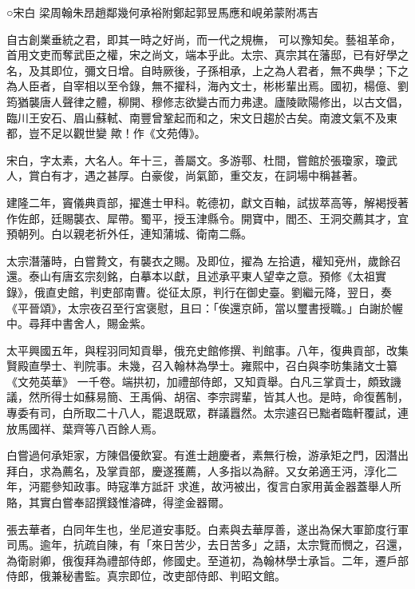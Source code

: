 
\begin{pinyinscope}

 ○宋白
 梁周翰朱昂趙鄰幾何承裕附鄭起郭昱馬應和峴弟蒙附馮吉



 自古創業垂統之君，即其一時之好尚，而一代之規橅，
 可以豫知矣。藝祖革命，首用文吏而奪武臣之權，宋之尚文，端本乎此。太宗、真宗其在藩邸，已有好學之名，及其即位，彌文日增。自時厥後，子孫相承，上之為人君者，無不典學；下之為人臣者，自宰相以至令錄，無不擢科，海內文士，彬彬輩出焉。國初，楊億、劉筠猶襲唐人聲律之體，柳開、穆修志欲變古而力弗逮。廬陵歐陽修出，以古文倡，臨川王安石、眉山蘇軾、南豐曾鞏起而和之，宋文日趨於古矣。南渡文氣不及東都，豈不足以觀世變
 歟！作《文苑傳》。



 宋白，字太素，大名人。年十三，善屬文。多游鄠、杜間，嘗館於張瓊家，瓊武人，賞白有才，遇之甚厚。白豪俊，尚氣節，重交友，在詞場中稱甚著。



 建隆二年，竇儀典貢部，擢進士甲科。乾德初，獻文百軸，試拔萃高等，解褐授著作佐郎，廷賜襲衣、犀帶。蜀平，授玉津縣令。開寶中，閻丕、王洞交薦其才，宜預朝列。白以親老祈外任，連知蒲城、衛南二縣。



 太宗潛藩時，白嘗贄文，有襲衣之賜。及即位，擢為
 左拾遺，權知兗州，歲餘召還。泰山有唐玄宗刻銘，白摹本以獻，且述承平東人望幸之意。預修《太祖實錄》，俄直史館，判吏部南曹。從征太原，判行在御史臺。劉繼元降，翌日，奏《平晉頌》，太宗夜召至行宮褒慰，且曰：「俟還京師，當以璽書授職。」白謝於幄中。尋拜中書舍人，賜金紫。



 太平興國五年，與程羽同知貢舉，俄充史館修撰、判館事。八年，復典貢部，改集賢殿直學士、判院事。未幾，召入翰林為學士。雍熙中，召白與李昉集諸文士纂《文苑英華》
 一千卷。端拱初，加禮部侍郎，又知貢舉。白凡三掌貢士，頗致譏議，然所得士如蘇易簡、王禹偁、胡宿、李宗諤輩，皆其人也。是時，命復舊制，專委有司，白所取二十八人，罷退既眾，群議囂然。太宗遽召已黜者臨軒覆試，連放馬國祥、葉齊等八百餘人焉。



 白嘗過何承矩家，方陳倡優飲宴。有進士趙慶者，素無行檢，游承矩之門，因潛出拜白，求為薦名，及掌貢部，慶遂獲薦，人多指以為辭。又女弟適王沔，淳化二年，沔罷參知政事。時寇準方詆訐
 求進，故沔被出，復言白家用黃金器蓋舉人所賂，其實白嘗奉詔撰錢惟濬碑，得塗金器爾。



 張去華者，白同年生也，坐尼道安事貶。白素與去華厚善，遂出為保大軍節度行軍司馬。逾年，抗疏自陳，有「來日苦少，去日苦多」之語，太宗覽而憫之，召還，為衛尉卿，俄復拜為禮部侍郎，修國史。至道初，為翰林學士承旨。二年，遷戶部侍郎，俄兼秘書監。真宗即位，改吏部侍郎、判昭文館。




\end{pinyinscope}
